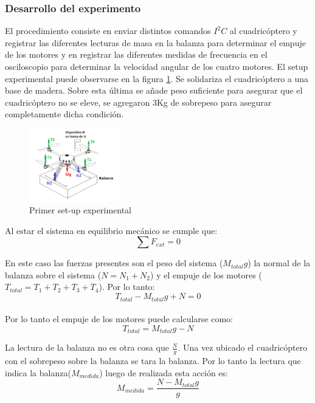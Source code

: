 \documentclass[main]{subfiles}
\begin{document}
\subsubsection*{Desarrollo del experimento}
El procedimiento consiste en enviar distintos comandos $I^2C$ al cuadric\'optero y registrar las diferentes lecturas de masa en la balanza para determinar el empuje de los motores y en registrar las diferentes medidas de frecuencia en el osciloscopio para determinar la velocidad angular de los cuatro motores.
El setup experimental puede observarse en la figura \ref{fig:setup1}.
Se solidariza el cuadric\'optero a una base de madera. Sobre esta \'ultima se a\~nade peso suficiente para asegurar que el cuadric\'optero no se eleve, se agregaron 3Kg de sobrepeso para asegurar completamente dicha condici\'on.
\begin{figure}
\vspace{-25pt}
  \begin{center}
    \includegraphics[width=0.35\textwidth]{./pics_motores/set1.png}
  \end{center}
  \caption{Primer set-up experimental}
  \label{fig:setup1}
\end{figure}
	
Al estar el sistema en equilibrio mec\'anico se cumple que:
\begin{equation}
\sum F_{ext}=0
\end{equation}

En este caso las fuerzas presentes son el peso del sistema ($M_{total}g$) la normal de la balanza sobre el sistema ($N=N_1+N_2$) y el empuje de los motores ($T_{total}=T_1+T_2+T_3+T_4$). Por lo tanto:
\begin{equation}
T_{total}-M_{total}g+N=0
\end{equation}\\

Por lo tanto el empuje de los motores puede calcularse como:
\begin{equation}
T_{total}=M_{total}g-N
\end{equation}

La lectura de la balanza no es otra cosa que $\frac{N}{g}$.
Una vez ubicado el cuadric\'optero con el sobrepeso sobre la balanza se tara la balanza. Por lo tanto la lectura que indica la balanza($M_{medida}$) luego de realizada esta acci\'on es:
\begin{equation}
M_{medida}=\frac{N-M_{total}g}{g}
\end{equation}
\end{document}
